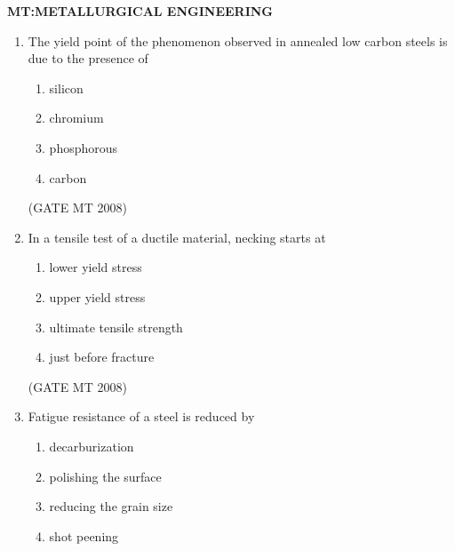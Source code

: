 \documentclass[11pt, letterpaper]{article}
\theoremstyle{remark}
\begin{document}
\begin{center}
{\large \textbf{MT:METALLURGICAL ENGINEERING}}
\end{center}    



\begin{enumerate}[label=Q.\arabic*]
\item The yield point of the phenomenon observed in annealed low carbon steels is due to the presence of
\vspace{-0.9em}
 \begin{multicols}{4}
   \begin{enumerate}[label=(\MakeUppercase{\alph*})]
        \item silicon
        \item chromium
        \item phosphorous 
        \item carbon
   \end{enumerate}
 \end{multicols}
\vspace{-5mm}
\hfill(GATE MT 2008)

\item In a tensile test of a ductile material, necking starts at
\vspace{-0.9em}
\begin{multicols}{2}
      \begin{enumerate}[label=(\MakeUppercase{\alph*})]
        \item lower yield stress
        \item upper yield stress
        \item ultimate tensile strength
        \item just before fracture
      \end{enumerate}
    \end{multicols}
\vspace{-5mm}

\hfill(GATE MT 2008)

\item Fatigue resistance of a steel is reduced by
\vspace{-0.9em}
\begin{multicols}{2}
      \begin{enumerate}[label=(\MakeUppercase{\alph*})]
        \item decarburization
        \item polishing the surface
        \item reducing the grain size
        \item shot peening
      \end{enumerate}
    \end{multicols}
\vspace{-5mm}


\end{enumerate}
\end{document}

